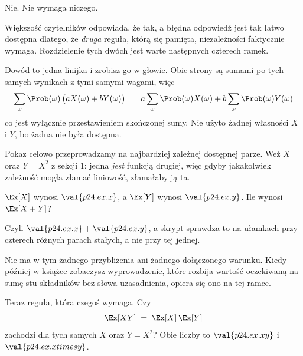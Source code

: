 \begin{fr}
\begin{ansblock}
Nie. Nie wymaga niczego.
\end{ansblock}

Większość czytelników odpowiada, że tak, a błędna odpowiedź jest tak łatwo
dostępna dlatego, że \emph{druga} reguła, którą się pamięta, niezależności
faktycznie wymaga. Rozdzielenie tych dwóch jest warte następnych czterech
ramek.

Dowód to jedna linijka i zrobisz go w głowie. Obie strony są sumami po tych
samych wynikach z tymi samymi wagami, więc
\[ \sum_{\omega} \Prob(\omega)\,\bigl(aX(\omega) + bY(\omega)\bigr)
   \;=\; a\sum_{\omega} \Prob(\omega)X(\omega)
       + b\sum_{\omega} \Prob(\omega)Y(\omega) \]
co jest wyłącznie przestawieniem skończonej sumy. Nie użyto żadnej własności
$X$ i $Y$, bo żadna nie była dostępna.
\end{fr}

\begin{fr}
Pokaz celowo przeprowadzamy na najbardziej zależnej dostępnej parze. Weź $X$
oraz $Y = X^{2}$ z sekcji 1: jedna \emph{jest} funkcją drugiej, więc gdyby
jakakolwiek zależność mogła złamać liniowość, złamałaby ją ta.

$\Ex[X]$ wynosi $\val{p24.ex.x}$, a $\Ex[Y]$ wynosi $\val{p24.ex.y}$. Ile
wynosi $\Ex[X + Y]$?
\dotline
\nextframe
\end{fr}

\begin{fr}

Czyli $\val{p24.ex.x} + \val{p24.ex.y}$, a skrypt sprawdza to na ułamkach przy
czterech różnych parach stałych, a nie przy tej jednej.

Nie ma w tym żadnego przybliżenia ani żadnego dołączonego warunku. Kiedy
później w książce zobaczysz wyprowadzenie, które rozbija wartość oczekiwaną na
sumę stu składników bez słowa uzasadnienia, opiera się ono na tej ramce.
\end{fr}

\begin{fr}
Teraz reguła, która czegoś wymaga. Czy
\[ \Ex[XY] \;=\; \Ex[X]\,\Ex[Y] \]
zachodzi dla tych samych $X$ oraz $Y = X^{2}$? Obie liczby to
$\val{p24.ex.xy}$ i $\val{p24.ex.xtimesy}$.
\dotline
\nextframe
\end{fr}

